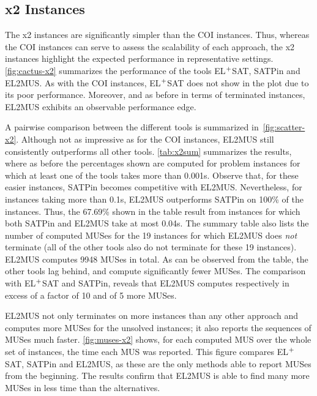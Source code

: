 \documentclass{llncs}
\newcommand{\tn}{\textnormal}
\newcommand{\elsat}{EL$^{\tn{+}}$SAT\xspace}
\begin{document}
\subsection{x2 Instances}

The x2 instances are significantly simpler than the COI
instances. Thus, whereas the COI instances can serve to assess the
scalability of each approach, the x2 instances highlight the expected
performance in representative settings.
\autoref{fig:cactus-x2} summarizes the performance of the tools
\elsat, SATPin 
and EL2MUS. As with the COI instances, \elsat
does not show in the plot due to its poor performance.
Moreover, and as before in terms of terminated instances, EL2MUS
exhibits an observable performance edge.


A pairwise comparison between the different tools is summarized
in~\autoref{fig:scatter-x2}. Although not as impressive as for the COI
instances, EL2MUS still consistently outperforms all other tools.
\autoref{tab:x2sum} summarizes the results, where as before the
percentages shown are computed for problem instances for which at
least one of the tools takes more than 0.001s. Observe that, for these
easier instances, SATPin becomes competitive with EL2MUS.
Nevertheless, for instances taking more than 0.1s, EL2MUS outperforms
SATPin on 100\% of the instances. Thus, the 67.69\% shown in the table
result from instances for which both SATPin and EL2MUS take at most
0.04s.
The summary table also lists the number of computed MUSes for the 19
instances for which EL2MUS does {\em not} terminate (all of the other
tools also do not terminate for these 19 instances). EL2MUS computes
9948 MUSes in total. As can be observed from the table, the other
tools lag behind, and compute significantly fewer MUSes. 
The comparison with \elsat and
SATPin, reveals that EL2MUS computes respectively in excess of a
factor of 10 and of 5 more MUSes.


EL2MUS not only terminates on more instances than any other approach
and computes more MUSes for the unsolved instances; it also reports
the sequences of MUSes much faster. \autoref{fig:muses-x2} shows, for
each computed MUS over the whole set of instances, the time each MUS
was reported. This figure compares \elsat, SATPin and EL2MUS, as these
are the only methods able to report MUSes from the beginning. The
results confirm that EL2MUS is able to find many more MUSes in less
time than the alternatives.

\begin{comment}
\begin{figure}[t]
  \centering
  \texttt{[image: ./results/sqplots/x2/definitive-plot.pdf]} \caption{Cactus plot with the MUSes \elsat, SATPin and
    EL2MUS compute (x2 instances)} \label{fig:definitive-x2}
\end{figure}
\end{comment}
\end{document}
